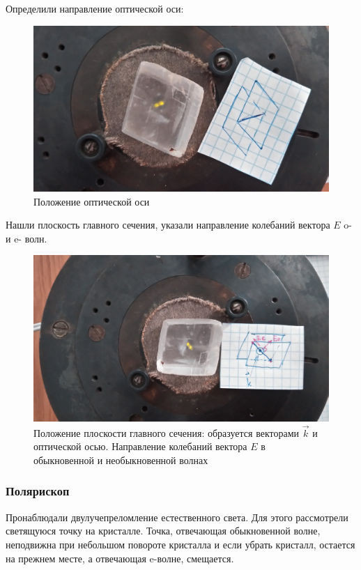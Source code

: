 Определили направление оптической оси:
\begin{figure}[H]
	\centering
	\includegraphics[width=\textwidth]{pic/rot_eo.jpg}
	\caption{Положение оптической оси}
	\label{fig:figure1}
\end{figure}

Нашли плоскость главного сечения, указали направление колебаний вектора $E$ o- и e- волн.
\begin{figure}[H]
	\centering
	\includegraphics[width=\textwidth]{pic/eo.jpg}
	\caption{Положение плоскости главного сечения: образуется векторами $\vec{k}$ и оптической осью. Направление колебаний вектора $E$ в обыкновенной и необыкновенной волнах}
	\label{fig:figure1}
\end{figure}

\subsubsection{Полярископ}

Пронаблюдали двулучепреломление естественного света. Для этого рассмотрели светящуюся точку на кристалле. Точка, отвечающая обыкновенной волне, неподвижна при небольшом повороте кристалла и если убрать кристалл, остается на прежнем месте, а отвечающая e-волне, смещается.

